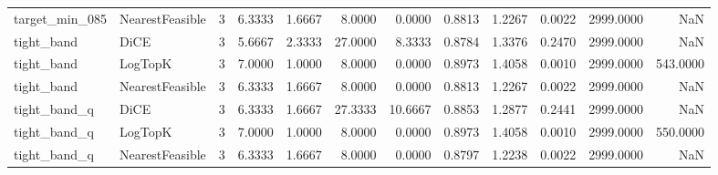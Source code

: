 \begin{tabular}{llrrrrrrrrrr}
      target\_min\_085 & NearestFeasible &      3 &            6.3333 &          1.6667 &          8.0000 &        0.0000 &             0.8813 &         1.2267 &       0.0022 &          2999.0000 &                   NaN \\
          tight\_band &            DiCE &      3 &            5.6667 &          2.3333 &         27.0000 &        8.3333 &             0.8784 &         1.3376 &       0.2470 &          2999.0000 &                   NaN \\
          tight\_band &         LogTopK &      3 &            7.0000 &          1.0000 &          8.0000 &        0.0000 &             0.8973 &         1.4058 &       0.0010 &          2999.0000 &              543.0000 \\
          tight\_band & NearestFeasible &      3 &            6.3333 &          1.6667 &          8.0000 &        0.0000 &             0.8813 &         1.2267 &       0.0022 &          2999.0000 &                   NaN \\
        tight\_band\_q &            DiCE &      3 &            6.3333 &          1.6667 &         27.3333 &       10.6667 &             0.8853 &         1.2877 &       0.2441 &          2999.0000 &                   NaN \\
        tight\_band\_q &         LogTopK &      3 &            7.0000 &          1.0000 &          8.0000 &        0.0000 &             0.8973 &         1.4058 &       0.0010 &          2999.0000 &              550.0000 \\
        tight\_band\_q & NearestFeasible &      3 &            6.3333 &          1.6667 &          8.0000 &        0.0000 &             0.8797 &         1.2238 &       0.0022 &          2999.0000 &                   NaN \\
\bottomrule
\end{tabular}
